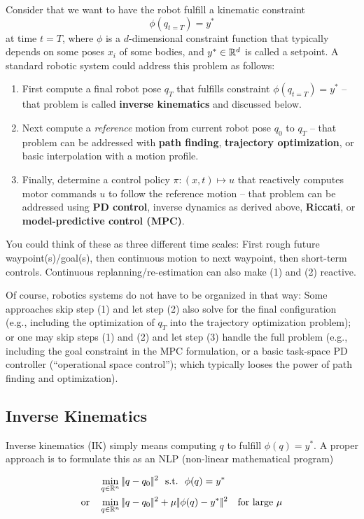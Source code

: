 Consider that we want to have the robot fulfill a kinematic constraint
$$\phi(q_{t=T}) = y^*$$ at time $t=T$, where $\phi$ is a $d$-dimensional
constraint function that typically depends on some poses $x_i$ of some bodies,
and $y^*\in{\mathbb{R}}^d$ is called a setpoint. A standard robotic system
could address this problem as follows:
\begin{enumerate}
  \item First compute a final robot pose $q_T$ that fulfills constraint 
    $\phi(q_{t=T}) = y^*$ -- that problem is called \textbf{inverse
    kinematics} and discussed below.
  \item Next compute a \emph{reference} motion from current robot pose
    $q_0$ to $q_T$ -- that problem can be addressed with \textbf{path
    finding}, \textbf{trajectory optimization}, or basic interpolation
    with a motion profile.
  \item Finally, determine a control policy $\pi: (x,t) \mapsto u$
    that reactively computes motor commands $u$ to follow the
    reference motion -- that problem can be addressed using \textbf{PD
    control}, inverse dynamics as derived above, \textbf{Riccati},
    or \textbf{model-predictive control (MPC)}.
\end{enumerate}
You could think of these as three different time scales: First rough
future waypoint(s)/goal(s), then continuous motion to next waypoint,
then short-term controls. Continuous replanning/re-estimation can also make (1) and (2) reactive.

Of course, robotics systems do not have to be organized in that
way: Some approaches skip step (1) and let step (2) also solve for the
final configuration (e.g., including the optimization of $q_T$ into
the trajectory optimization problem); or one may skip steps (1) and
(2) and let step (3) handle the full problem (e.g., including the goal
constraint in the MPC formulation, or a basic task-space PD controller
(``operational space control''); which typically looses the power of
path finding and optimization).


\subsection{Inverse Kinematics}

Inverse kinematics (IK) simply means computing $q$ to fulfill $\phi(q) =
y^*$. A proper approach is to formulate this as an NLP (non-linear
mathematical program)

$$\begin{align}
&\min_{q\in{\mathbb{R}}^n} |\!|q-q_0|\!|^2 ~~\text{s.t.}~~ \phi(q) = y^* \label{eqIK}\\
\text{or}\quad&\min_{q\in{\mathbb{R}}^n} |\!|q-q_0|\!|^2 + \mu |\!|\phi(q) -
y^*|\!|^2 \quad\text{for large $\mu$} 
\end{align}$$

